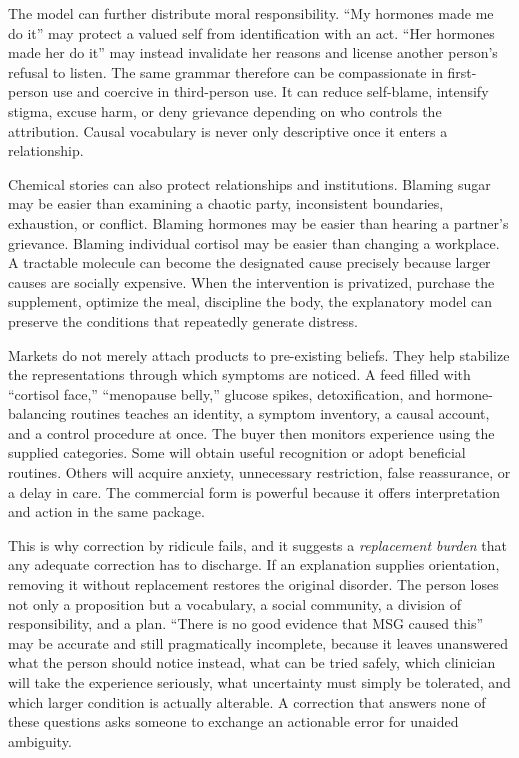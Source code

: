 \documentclass[11pt]{article}
\begin{document}
The model can further distribute moral responsibility. ``My hormones made me do it'' may protect a valued self from identification with an act. ``Her hormones made her do it'' may instead invalidate her reasons and license another person's refusal to listen. The same grammar therefore can be compassionate in first-person use and coercive in third-person use. It can reduce self-blame, intensify stigma, excuse harm, or deny grievance depending on who controls the attribution. Causal vocabulary is never only descriptive once it enters a relationship.

Chemical stories can also protect relationships and institutions. Blaming sugar may be easier than examining a chaotic party, inconsistent boundaries, exhaustion, or conflict. Blaming hormones may be easier than hearing a partner's grievance. Blaming individual cortisol may be easier than changing a workplace. A tractable molecule can become the designated cause precisely because larger causes are socially expensive. When the intervention is privatized, purchase the supplement, optimize the meal, discipline the body, the explanatory model can preserve the conditions that repeatedly generate distress.

Markets do not merely attach products to pre-existing beliefs. They help stabilize the representations through which symptoms are noticed. A feed filled with ``cortisol face,'' ``menopause belly,'' glucose spikes, detoxification, and hormone-balancing routines teaches an identity, a symptom inventory, a causal account, and a control procedure at once. The buyer then monitors experience using the supplied categories. Some will obtain useful recognition or adopt beneficial routines. Others will acquire anxiety, unnecessary restriction, false reassurance, or a delay in care. The commercial form is powerful because it offers interpretation and action in the same package.

This is why correction by ridicule fails, and it suggests a \emph{replacement burden} that any adequate correction has to discharge. If an explanation supplies orientation, removing it without replacement restores the original disorder. The person loses not only a proposition but a vocabulary, a social community, a division of responsibility, and a plan. ``There is no good evidence that MSG caused this'' may be accurate and still pragmatically incomplete, because it leaves unanswered what the person should notice instead, what can be tried safely, which clinician will take the experience seriously, what uncertainty must simply be tolerated, and which larger condition is actually alterable. A correction that answers none of these questions asks someone to exchange an actionable error for unaided ambiguity.
\end{document}
